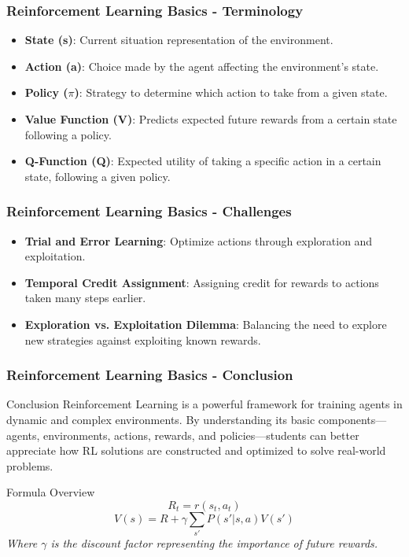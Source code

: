 \documentclass[aspectratio=169]{beamer}
\begin{document}
\begin{frame}[fragile]
    \frametitle{Reinforcement Learning Basics - Terminology}
    \begin{itemize}
        \item \textbf{State (s)}: Current situation representation of the environment.
        \item \textbf{Action (a)}: Choice made by the agent affecting the environment's state.
        \item \textbf{Policy ($\pi$)}: Strategy to determine which action to take from a given state.
        \item \textbf{Value Function (V)}: Predicts expected future rewards from a certain state following a policy.
        \item \textbf{Q-Function (Q)}: Expected utility of taking a specific action in a certain state, following a given policy.
    \end{itemize}
\end{frame}

\begin{frame}[fragile]
    \frametitle{Reinforcement Learning Basics - Challenges}
    \begin{itemize}
        \item \textbf{Trial and Error Learning}: Optimize actions through exploration and exploitation.
        \item \textbf{Temporal Credit Assignment}: Assigning credit for rewards to actions taken many steps earlier.
        \item \textbf{Exploration vs. Exploitation Dilemma}: Balancing the need to explore new strategies against exploiting known rewards.
    \end{itemize}
\end{frame}

\begin{frame}[fragile]
    \frametitle{Reinforcement Learning Basics - Conclusion}
    \begin{block}{Conclusion}
        Reinforcement Learning is a powerful framework for training agents in dynamic and complex environments. By understanding its basic components—agents, environments, actions, rewards, and policies—students can better appreciate how RL solutions are constructed and optimized to solve real-world problems.
    \end{block}
    
    \begin{block}{Formula Overview}
        \begin{equation}
            R_t = r(s_t, a_t)
        \end{equation}
        \begin{equation}
            V(s) = R + \gamma \sum_{s'} P(s'|s, a)V(s')
        \end{equation}
        \textit{Where $\gamma$ is the discount factor representing the importance of future rewards.}
    \end{block}
\end{frame}
\end{document}
